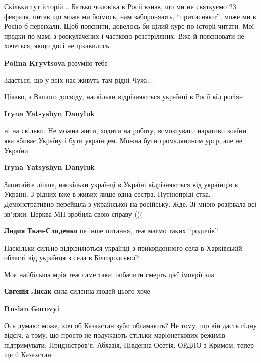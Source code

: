 \begin{itemize}

Скільки тут історій... Батько чоловіка в Росіі взнав, що ми не святкуємо 23
февраля, питав що може ми боїмось, нам забороняють, \enquote{притисняют}, може ми в
Росію б переїхали. Щоб пояснити, довелось би цілий курс по історіі читати. Мої
предки по мамі з розкулачених і частково розстріляних. Вже й пояснювати не
хочеться, якщо досі не цікавились.

\begin{itemize} %
\textbf{Polina Kryvtsova} розумію тебе

Здається, що у всіх нас живуть там рідні Чужі...
\end{itemize} %

Цікаво, з Вашого досвіду, наскільки відрізняються українці в Росії від росіян

\begin{itemize} %
\textbf{Iryna Yatsyshyn Danyluk} 

ні на скільки. Не можна жити, ходити на роботу, всмоктувати наративи коаїни яка
вбиває Україну і бути українцем. Можна бути громадянином урср, але не України

\textbf{Iryna Yatsyshyn Danyluk} 

Запитайте ліпше, наскільки українці в Україні відрізняються від українців в
Україні. З рідних вже в живих лише одна сестра. Путінопріді-стка.
Демонстративно перейшла з української на російську. Жде. Зі мною розірвала всі
зв"язки. Церква МП зробила свою справу (((

\textbf{Лидия Ткач-Слиденко} це інше питання, теж маємо таких \enquote{родичів}


Наскільки сильно відрізняються українці з прикордонного села в Харківській
області від українця з села в Білгородської?

\end{itemize} %

Моя найбільша мрія теж саме така: побачити смерть цієї імперії зла

\begin{itemize} %
\textbf{Євгенія Лисак} сила силенна людей цього хоче

\textbf{Ruslan Gorovyi} 

Ось думаю: може, хоч об Казахстан зуби обламають? Не тому, що він дасть гідну
відсіч, а тому, що просто не подужають стільки маріонеткових режимів
підтримувати: Придністров'я, Абхазія, Південна Осетія, ОРДЛО з Кримом, тепер ще
й Казахстан.


\end{itemize}
\end{itemize}
